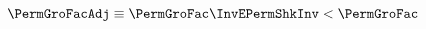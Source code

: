   \begin{equation}\begin{gathered}\begin{aligned}
    \PermGroFacAdj & \equiv \PermGroFac \InvEPermShkInv < \PermGroFac \label{eq:PermGroFacAdj}
  \end{aligned}\end{gathered}\end{equation}
